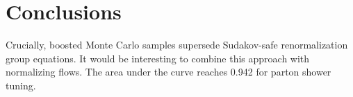 \section{Conclusions}\label{sec:conclusions}

Crucially, boosted Monte Carlo samples supersede Sudakov-safe
renormalization group equations. It would be interesting to combine this
approach with normalizing flows. The area under the curve reaches 0.942
for parton shower tuning.

